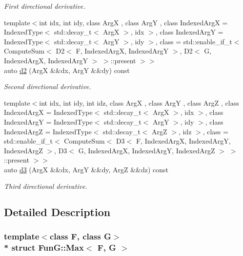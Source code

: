 \begin{DoxyCompactItemize}
\begin{DoxyCompactList}\small\item\em First directional derivative. \end{DoxyCompactList}\item 
{\footnotesize template$<$int idx, int idy, class ArgX , class ArgY , class Indexed\+ArgX  = Indexed\+Type$<$ std\+::decay\+\_\+t$<$ Arg\+X $>$, idx $>$, class Indexed\+ArgY  = Indexed\+Type$<$ std\+::decay\+\_\+t$<$ Arg\+Y $>$, idy $>$, class  = std\+::enable\+\_\+if\+\_\+t$<$                       Compute\+Sum$<$ D2$<$ F, Indexed\+Arg\+X, Indexed\+Arg\+Y $>$,                                   D2$<$ G, Indexed\+Arg\+X, Indexed\+Arg\+Y $>$ $>$\+::present $>$$>$ }\\auto \hyperlink{structFunG_1_1Max_a46739797766a13c81d6a61b7bb3d1ccd}{d2} (ArgX \&\&dx, ArgY \&\&dy) const 
\begin{DoxyCompactList}\small\item\em Second directional derivative. \end{DoxyCompactList}\item 
{\footnotesize template$<$int idx, int idy, int idz, class ArgX , class ArgY , class ArgZ , class Indexed\+ArgX  = Indexed\+Type$<$ std\+::decay\+\_\+t$<$ Arg\+X $>$, idx $>$, class Indexed\+ArgY  = Indexed\+Type$<$ std\+::decay\+\_\+t$<$ Arg\+Y $>$, idy $>$, class Indexed\+ArgZ  = Indexed\+Type$<$ std\+::decay\+\_\+t$<$ Arg\+Z $>$, idz $>$, class  = std\+::enable\+\_\+if\+\_\+t$<$                       Compute\+Sum$<$ D3$<$ F, Indexed\+Arg\+X, Indexed\+Arg\+Y, Indexed\+Arg\+Z $>$,                                   D3$<$ G, Indexed\+Arg\+X, Indexed\+Arg\+Y, Indexed\+Arg\+Z $>$ $>$\+::present $>$$>$ }\\auto \hyperlink{structFunG_1_1Max_aea2802909b5bc234fd6baafb0e7fdf16}{d3} (ArgX \&\&dx, ArgY \&\&dy, ArgZ \&\&dz) const 
\begin{DoxyCompactList}\small\item\em Third directional derivative. \end{DoxyCompactList}\end{DoxyCompactItemize}


\subsection{Detailed Description}
\subsubsection*{template$<$class F, class G$>$\\*
struct Fun\+G\+::\+Max$<$ F, G $>$}

